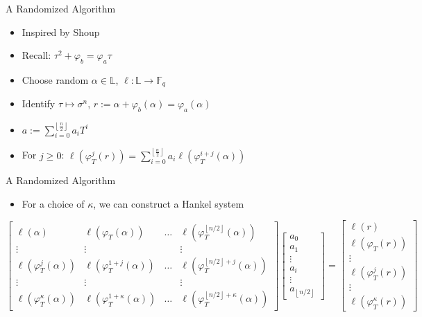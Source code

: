 \documentclass{beamer}
\newcommand{\f}{\mathbb{F}}
\begin{document}
\begin{frame}{A Randomized Algorithm}

\begin{itemize}
    \item Inspired by Shoup  
    \item Recall: $\tau^2 + \varphi_b = \varphi_a \tau$
    \item Choose random $\alpha \in \mathbb{L}$, $\ell : \mathbb{L} \to \f_q$
    \item Identify $\tau \mapsto \sigma^n$, $r := \alpha + \varphi_b(\alpha) = \varphi_a(\alpha)$
    \item $a := \sum_{i=0}^{\left\lfloor \frac{n}{2} \right\rfloor}a_iT^i$
    \item For $j \geq 0$: $\ell(\varphi_T^j(r)) = \sum_{i = 0}^{\left\lfloor{\frac{n}{2}} \right\rfloor}a_i\ell(\varphi_T^{i+j}(\alpha))$
    \end{itemize}
    
    \end{frame}
    
    \begin{frame}{A Randomized Algorithm}
    \begin{itemize}
    \item For a choice of $\kappa$, we can construct a Hankel system
\end{itemize}
\[ \begin{bmatrix}\ell(\alpha) & \ell(\varphi_T(\alpha)) & \ldots & \ell(\varphi_T^{\left\lfloor n/2 \right\rfloor}(\alpha)) \\ \vdots & \vdots & & \vdots \\ 

\ell(\varphi_T^{j}(\alpha)) & \ell(\varphi_T^{1+j}(\alpha)) & \ldots & \ell(\varphi_T^{\left\lfloor n/2 \right\rfloor+j}(\alpha)) \\ \vdots & \vdots & & \vdots \\

\ell(\varphi_T^{\kappa}(\alpha)) & \ell(\varphi_T^{1 + \kappa }(\alpha)) & \ldots & \ell(\varphi_T^{\left\lfloor n/2 \right\rfloor + \kappa}(\alpha))

\end{bmatrix} \begin{bmatrix} a_0 \\ a_1 \\ \vdots \\ a_i \\ \vdots \\ a_{\left\lfloor n/2 \right\rfloor} \end{bmatrix} = \begin{bmatrix} \ell(r) \\ \ell(\varphi_T(r)) \\ \vdots \\ \ell(\varphi_T^j(r)) \\ \vdots  \\   \ell(\varphi_T^{\kappa}(r)) \end{bmatrix} \]
    
\end{frame}
\end{document}
